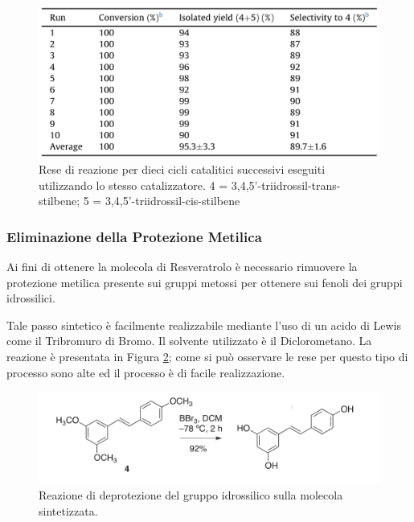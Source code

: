 \documentclass[a4paper, 12pt]{article}
\begin{document}
\begin{figure}[H]
	\centering
	\includegraphics[width=\linewidth]{immagini/perc_cata_resv.png}
	\caption{Rese di reazione per dieci cicli catalitici successivi eseguiti utilizzando lo stesso catalizzatore. 4 = 3,4,5'-triidrossil-trans-stilbene; 5 = 3,4,5'-triidrossil-cis-stilbene}
	\label{fig:perc_cata_resv}
\end{figure}

\subsubsection{Eliminazione della Protezione Metilica}
Ai fini di ottenere la molecola di Resveratrolo è necessario rimuovere la protezione metilica presente sui gruppi metossi per ottenere sui fenoli dei gruppi idrossilici.

Tale passo sintetico è facilmente realizzabile mediante l'uso di un acido di Lewis come il Tribromuro di Bromo. Il solvente utilizzato è il Diclorometano.
La reazione è presentata in Figura \ref{fig:deprot_resveratrolo}; come si può osservare le rese per questo tipo di processo sono alte ed il processo è di facile realizzazione. \cite{alejandro_v._martinez_expedient_2017}

\begin{figure}[H]
	\centering
	\includegraphics[width=\linewidth]{immagini/deprot_resveratrolo.png}
	\caption{Reazione di deprotezione del gruppo idrossilico sulla molecola sintetizzata.}
	\label{fig:deprot_resveratrolo}
\end{figure}
\end{document}
